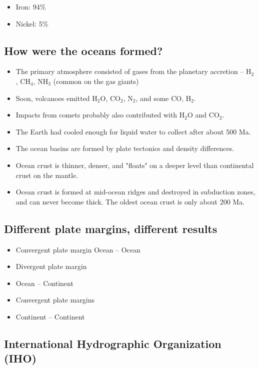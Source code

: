 \begin{itemize}
    \item Iron: 94\%
    \item Nickel: 5\%
\end{itemize}

\subsection{How were the oceans formed?}

\begin{itemize}
    \item The primary atmosphere consisted of gases from the planetary
        accretion -- H$_2$, CH$_4$, NH$_3$ (common on the gas giants)
    \item Soon, volcanoes emitted H$_2$O, CO$_2$, N$_2$, and some CO, H$_2$.
    \item Impacts from comets probably also contributed with H$_2$O and
        CO$_2$.
    \item The Earth had cooled enough for liquid water to collect after about
        500 Ma.
    \item The ocean basins are formed by plate tectonics and density
        differences.
    \item Ocean crust is thinner, denser, and "floats" on a deeper level than
        continental crust on the mantle.
    \item Ocean crust is formed at mid-ocean ridges and destroyed in
        subduction zones, and can never become thick. The oldest ocean crust
        is only about 200 Ma.
\end{itemize}

\subsection{Different plate margins, different results}

\begin{itemize}
    \item Convergent plate margin Ocean -- Ocean
    \item Divergent plate margin
    \item Ocean -- Continent
    \item Convergent plate margins
    \item Continent -- Continent
\end{itemize}

\subsection{International Hydrographic Organization (IHO)}

